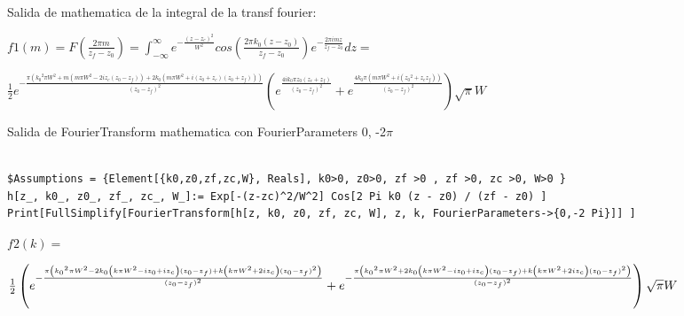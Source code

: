 \documentclass{article}
\begin{document}
Salida de mathematica de la integral de la transf fourier:


$
f1(m)=F(  ) = \int_{- \infty}^{\infty}{e^{-} cos() e^{-} dz } = $

$ e^{-} \left(e^{}+e^{}\right) \sqrt{\pi } W$


Salida de FourierTransform mathematica con FourierParameters 0, -2$\pi$ 

\begin{verbatim}

$Assumptions = {Element[{k0,z0,zf,zc,W}, Reals], k0>0, z0>0, zf >0 , zf >0, zc >0, W>0 }
h[z_, k0_, z0_, zf_, zc_, W_]:= Exp[-(z-zc)^2/W^2] Cos[2 Pi k0 (z - z0) / (zf - z0) ]
Print[FullSimplify[FourierTransform[h[z, k0, z0, zf, zc, W], z, k, FourierParameters->{0,-2 Pi}]] ]

\end{verbatim}
$f2(k)=$

$\frac{1}{2} \left(e^{-\frac{\pi  \left(\text{$k_0$}^2 \pi  W^2-2 \text{$k_0$} \left(k \pi  W^2-i \text{$z_0$}+i \text{$z_c$}\right) (\text{$z_0$}-\text{$z_f$})+k
\left(k \pi  W^2+2 i \text{$z_c$}\right) (\text{$z_0$}-\text{$z_f$})^2\right)}{(\text{$z_0$}-\text{$z_f$})^2}}+ \\
e^{-\frac{\pi  \left(\text{$k_0$}^2 \pi  W^2+2 \text{$k_0$}
\left(k \pi  W^2-i \text{$z_0$}+i \text{$z_c$}\right) (\text{$z_0$}-\text{$z_f$})+k \left(k \pi  W^2+2 i \text{$z_c$}\right) (\text{$z_0$}-\text{$z_f$})^2\right)}{(\text{$z_0$}-\text{$z_f$})^2}}\right)
\sqrt{\pi } W$
\end{document}
